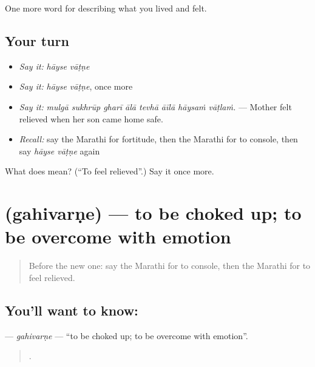 \begin{grammarlens}[title={What you've built}]
One more word for describing what you lived and felt.
\end{grammarlens}

\subsection*{Your turn}
\begin{itemize}
\raggedright
  \item \emph{Say it:} \emph{hāyse vāṭṇe}
  \item \emph{Say it:} \emph{hāyse vāṭṇe}, once more
  \item \emph{Say it:} \emph{mulgā sukhrūp gharī ālā tevhā āīlā hāysaṁ vāṭlaṁ.} — Mother felt relieved when her son came home safe.
  \item \emph{Recall:} say the Marathi for fortitude, then the Marathi for to console, then say \emph{hāyse vāṭṇe} again
\end{itemize}

\begin{tcolorbox}[breakable,colback=teal!4,colframe=teal!35!black,title={Before you move on}]
What does   mean? (\textquotedblleft{}To feel relieved\textquotedblright{}.) Say it once more.
\end{tcolorbox}
\section[\texorpdfstring{\mr{गहिवरणे} (gahivarṇe)}{गहिवरणे (gahivarṇe)}]{ (gahivarṇe) — to be choked up; to be overcome with emotion}

\label{lesson:MR-C458-gahivarne}



\begin{quote}
Before the new one: say the Marathi for to console, then the Marathi for to feel relieved.
\end{quote}

\subsection*{You'll want to know: }
\textbf{} — \emph{gahivarṇe} — \textquotedblleft{}to be choked up; to be overcome with emotion\textquotedblright{}.

\begin{quote}
    .
\end{quote}

